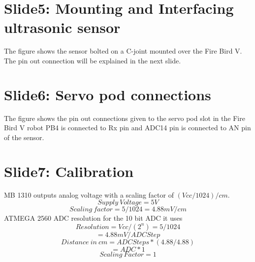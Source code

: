 \documentclass[a4paper,29.6pt]{article}
\begin{document}
\section{Slide5: Mounting and Interfacing ultrasonic sensor}
\begin{small}
The figure shows the sensor bolted on a C-joint mounted over the Fire Bird V. The pin out connection will be explained in the next slide.
\end{small}


\section{Slide6: Servo pod connections}
\begin{small}
The figure shows the pin out connections given to the servo pod slot in the Fire Bird V robot PB4 is connected to Rx pin and ADC14 pin is connected to AN pin of the sensor.

\end{small}

\section{Slide7: Calibration}
\begin{small}
MB 1310 outputs analog voltage with a scaling factor of $(V{cc}/1024)/cm.$
		 $$Supply\: Voltage = 5V$$
		 $$Scaling\: factor= 5/1024 = 4.88mV/cm$$
		 ATMEGA 2560 ADC resolution for the 10 bit ADC it uses $$ Resolution = Vcc/(2^n) =5/1024$$ $$= 4.88mV/ADC Step$$
		 $$Distance\: in\: cm = ADC Steps * (4.88/4.88)$$ $$= ADC * 1$$ 
		 $$Scaling\: Factor = 1$$
\end{small}
\end{document}
